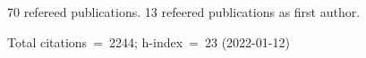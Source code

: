 70 refereed publications. 13 refeered publications as first author.

Total citations~=~2244; h-index~=~23 (2022-01-12)